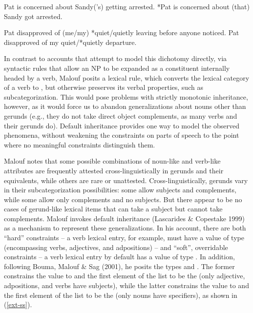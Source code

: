 \documentclass[output=paper]{langsci/langscibook}
\begin{document}
\begin{exe}
\ex\label{ger-n}
\begin{xlist}
	\ex\label{ger-n-a}
	Pat is concerned about Sandy('s) getting arrested.
	\ex\label{ger-n-b}
	*Pat is concerned about (that) Sandy got arrested.
\end{xlist}	
\ex\label{ger-v}
\begin{xlist}
	\ex\label{ger-v-a}
	Pat disapproved of (me/my) *quiet/quietly leaving before anyone noticed.
	\ex\label{ger-v-b}
	Pat disapproved of my quiet/*quietly departure.
\end{xlist}
\end{exe}



In contrast to accounts that attempt to model this dichotomy directly, via syntactic rules that allow an NP to be expanded as a constituent internally headed by a verb, Malouf posits a lexical rule, which converts the lexical category of a verb to , but otherwise preserves its verbal properties, such as subcategorization.
This would pose problems with strictly monotonic inheritance, however, as it would force us to abandon generalizations about nouns other than gerunds (e.g., they do not take direct object complements, as many verbs and their gerunds do).
Default inheritance provides one way to model the observed phenomena, without weakening the constraints on parts of speech to the point where no meaningful constraints distinguish them. 

Malouf notes that some possible combinations of noun-like and verb-like attributes are frequently attested cross-linguistically in gerunds and their equivalents, while others are rare or unattested.
Cross-linguistically, gerunds vary in their subcategorization possibilities: some allow subjects and complements, while some allow only complements and no subjects.
But there appear to be no cases of gerund-like lexical items that can take a subject but cannot take complements.
Malouf invokes default inheritance (Lascarides \& Copestake 1999) as a mechanism to represent these generalizations.
In his account, there are both ``hard'' constraints -- a verb lexical entry, for example, must have a  value of type  (encompassing verbs, adjectives, and adpositions) -- and ``soft'', overridable constraints -- a verb lexical entry by default has a  value of type .
In addition, following Bouma, Malouf \& Sag (2001), he posits the types  and .
The former constrains the  value to  and the first element of the  list to be the  (only adjective, adpositions, and verbs have subjects), while the latter constrains the  value to  and the first element of the  list to be the  (only nouns have specifiers), as shown in (\ref{ext-ss}).
\end{document}
